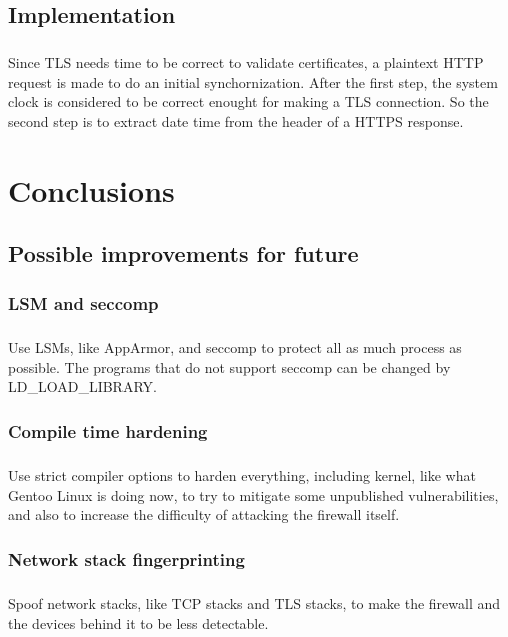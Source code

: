 \documentclass[mscthesis]{usiinfthesis}
\begin{document}
\section{Implementation}
\paragraph{}
Since TLS needs time to be correct to validate certificates, a plaintext HTTP request is made to do an initial synchornization. After the first step, the system clock is considered to be correct enought for making a TLS connection. So the second step is to extract date time from the header of a HTTPS response.

\chapter{Conclusions}

\section{Possible improvements for future}
\subsection{LSM and seccomp}
\paragraph{}
Use LSMs, like AppArmor, and seccomp to protect all as much process as possible. The programs that do not support seccomp can be changed by LD\_LOAD\_LIBRARY.

\subsection{Compile time hardening}
\paragraph{}
Use strict compiler options to harden everything, including kernel, like what Gentoo Linux is doing now, to try to mitigate some unpublished vulnerabilities, and also to increase the difficulty of attacking the firewall itself.

\subsection{Network stack fingerprinting}
\paragraph{}
Spoof network stacks, like TCP stacks and TLS stacks, to make the firewall and the devices behind it to be less detectable.
\end{document}

